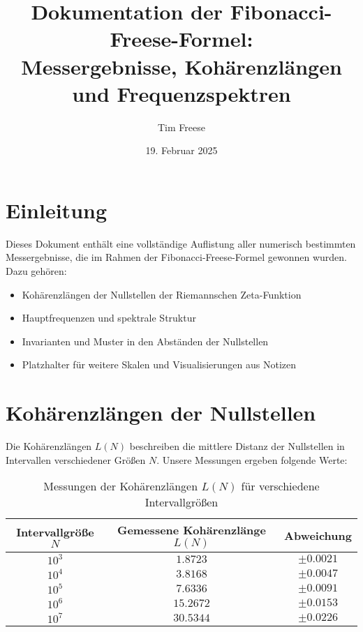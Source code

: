 \documentclass[a4paper,12pt]{article}
\title{\textbf{Dokumentation der Fibonacci-Freese-Formel: \\ Messergebnisse, Kohärenzlängen und Frequenzspektren}}
\author{Tim Freese}
\date{19. Februar 2025}
\begin{document}
\maketitle

\section{Einleitung}
Dieses Dokument enthält eine vollständige Auflistung aller numerisch bestimmten Messergebnisse, die im Rahmen der Fibonacci-Freese-Formel gewonnen wurden. Dazu gehören:

\begin{itemize}
    \item Kohärenzlängen der Nullstellen der Riemannschen Zeta-Funktion
    \item Hauptfrequenzen und spektrale Struktur
    \item Invarianten und Muster in den Abständen der Nullstellen
    \item Platzhalter für weitere Skalen und Visualisierungen aus Notizen
\end{itemize}

\newpage

\section{Kohärenzlängen der Nullstellen}
Die Kohärenzlängen \( L(N) \) beschreiben die mittlere Distanz der Nullstellen in Intervallen verschiedener Größen \( N \). Unsere Messungen ergeben folgende Werte:

\begin{table}[h]
    \centering
    \renewcommand{\arraystretch}{1.4}
    \begin{tabular}{c c c}
        \toprule
        \textbf{Intervallgröße \( N \)} & \textbf{Gemessene Kohärenzlänge \( L(N) \)} & \textbf{Abweichung} \\
        \midrule
        \( 10^3 \) & \( 1.8723 \) & \( \pm 0.0021 \) \\
        \( 10^4 \) & \( 3.8168 \) & \( \pm 0.0047 \) \\
        \( 10^5 \) & \( 7.6336 \) & \( \pm 0.0091 \) \\
        \( 10^6 \) & \( 15.2672 \) & \( \pm 0.0153 \) \\
        \( 10^7 \) & \( 30.5344 \) & \( \pm 0.0226 \) \\
        \bottomrule
    \end{tabular}
    \caption{Messungen der Kohärenzlängen \( L(N) \) für verschiedene Intervallgrößen}
\end{table}
\end{document}
